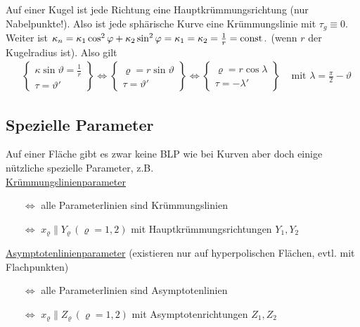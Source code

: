 \begin{anwendung}
 Auf einer Kugel ist jede Richtung eine Hauptkrümmungsrichtung (nur Nabelpunkte!). Also ist jede sphärische Kurve eine Krümmungslinie mit \(\tau_g \equiv 0\). Weiter ist \(\kappa_n = \kappa_1 \cos^2 \varphi + \kappa_2  \sin^2 \varphi = \kappa_1 = \kappa_2 = \frac{1}{r} = \operatorname{const}.\) (wenn \(r\) der Kugelradius ist). Also gilt
 \begin{align*}
  &\begin{Bmatrix}
   \kappa \sin \vartheta = \frac1r \\
   \tau = \vartheta'
  \end{Bmatrix} 
 \Leftrightarrow
 \begin{Bmatrix}
  \varrho = r \sin \vartheta \\
  \tau = \vartheta'
 \end{Bmatrix}
 \Leftrightarrow
 \begin{Bmatrix}
  \varrho = r \cos \lambda \\
  \tau = - \lambda'
 \end{Bmatrix}
 &\text{ mit } \lambda = \frac{\pi}{2} - \vartheta
 \end{align*}
\end{anwendung}

\subsection{Spezielle Parameter}
Auf einer Fläche gibt es zwar keine BLP wie bei Kurven aber doch einige nützliche spezielle Parameter, z.B. \\ \uline{Krümmungslinienparameter}  
\begin{itemize}
 \item[\(\Leftrightarrow\)] alle Parameterlinien sind Krümmungslinien 
 \item[\(\Leftrightarrow\)] \(x_\varrho \parallel Y_\varrho \, (\varrho = 1,2)\) mit Hauptkrümmungsrichtungen \(Y_1, Y_2\)
\end{itemize}
\uline{Asymptotenlinienparameter} (existieren nur auf hyperpolischen Flächen, evtl. mit Flachpunkten)
\begin{itemize}
 \item[\(\Leftrightarrow\)] alle Parameterlinien sind Asymptotenlinien
 \item[\(\Leftrightarrow\)] \(x_\varrho \parallel Z_\varrho \, (\varrho = 1,2)\) mit Asymptotenrichtungen \(Z_1, Z_2\)
\end{itemize}

